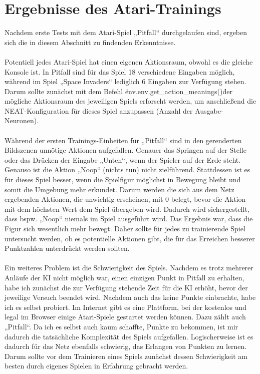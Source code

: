 \section{Ergebnisse des Atari-Trainings}
Nachdem erste Tests mit dem Atari-Spiel „Pitfall“ durchgelaufen sind, ergeben sich die in diesem Abschnitt zu findenden Erkenntnisse.
\\
\\
Potentiell jedes Atari-Spiel hat einen eigenen Aktionsraum, obwohl es die gleiche Konsole ist. In Pitfall sind für das Spiel 18 verschiedene Eingaben möglich, während im Spiel „Space Invaders“ lediglich 6 Eingaben zur Verfügung stehen. Darum sollte zunächst mit dem Befehl \"env.env.get\_action\_meanings()\" der mögliche Aktionsraum des jeweiligen Spiels erforscht werden, um anschließend die NEAT-Konfiguration für dieses Spiel anzupassen (Anzahl der Ausgabe-Neuronen).
\\
\\
Während der ersten Trainings-Einheiten für „Pitfall“ sind in den gerenderten Bildszenen unnötige Aktionen aufgefallen. Genauer das Springen auf der Stelle oder das Drücken der Eingabe „Unten“, wenn der Spieler auf der Erde steht. Genauso ist die Aktion „Noop“ (nichts tun) nicht zielführend. Stattdessen ist es für dieses Spiel besser, wenn die Spielfigur möglichst in Bewegung bleibt und somit die Umgebung mehr erkundet. Darum werden die sich aus dem Netz ergebenden Aktionen, die unwichtig erscheinen, mit 0 belegt, bevor die Aktion mit dem höchsten Wert dem Spiel übergeben wird. Dadurch wird sichergestellt, dass bspw. „Noop“ niemals im Spiel ausgeführt wird. Das Ergebnis war, dass die Figur sich wesentlich mehr bewegt. Daher sollte für jedes zu trainierende Spiel untersucht werden, ob es potentielle Aktionen gibt, die für das Erreichen besserer Punktzahlen unterdrückt werden sollten.
\\
\\
Ein weiteres Problem ist die Schwierigkeit des Spiels. Nachdem es trotz mehrerer Anläufe der KI nicht möglich war, einen einzigen Punkt in Pitfall zu erhalten, habe ich zunächst die zur Verfügung stehende Zeit für die KI erhöht, bevor der jeweilige Versuch beendet wird. Nachdem auch das keine Punkte einbrachte, habe ich es selbst probiert. Im Internet gibt es eine Plattform, bei der kostenlos und legal im Browser einige Atari-Spiele gestartet werden können. Dazu zählt auch „Pitfall“. Da ich es selbst auch kaum schaffte, Punkte zu bekommen, ist mir dadurch die tatsächliche Komplexität des Spiels aufgefallen. Logischerweise ist es dadurch für das Netz ebenfalls schwierig, das Erlangen von Punkten zu lernen. Darum sollte vor dem Trainieren eines Spiels zunächst dessen Schwierigkeit am besten durch eigenes Spielen in Erfahrung gebracht werden.
